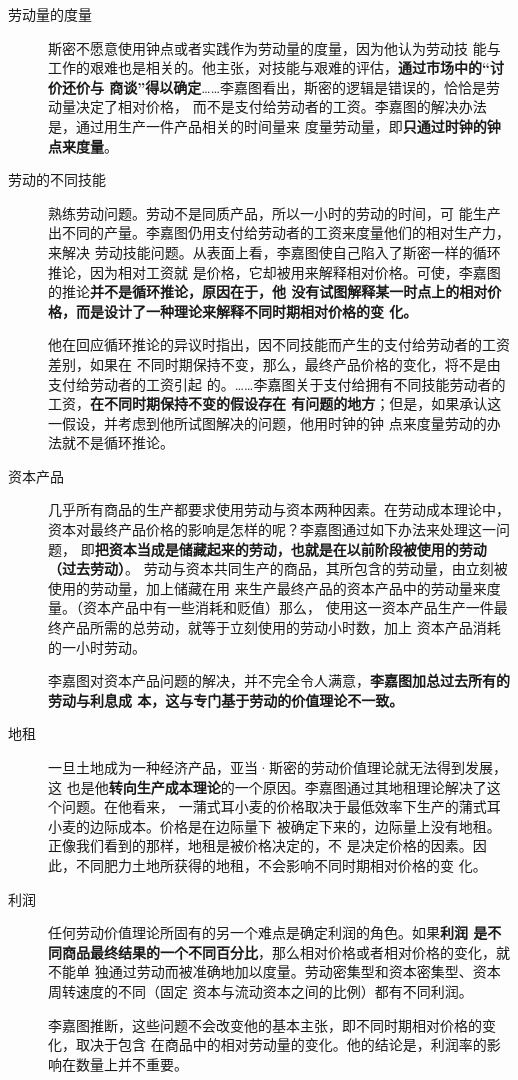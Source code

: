 \begin{description}
\item[劳动量的度量] 斯密不愿意使用钟点或者实践作为劳动量的度量，因为他认为劳动技
  能与工作的艰难也是相关的。他主张，对技能与艰难的评估，\textbf{通过市场中的“讨价还价与
  商谈”得以确定}……李嘉图看出，斯密的逻辑是错误的，恰恰是劳动量决定了相对价格，
  而不是支付给劳动者的工资。李嘉图的解决办法是，通过用生产一件产品相关的时间量来
  度量劳动量，即\textbf{只通过时钟的钟点来度量}。

\item[劳动的不同技能] 熟练劳动问题。劳动不是同质产品，所以一小时的劳动的时间，可
  能生产出不同的产量。李嘉图仍用支付给劳动者的工资来度量他们的相对生产力，来解决
  劳动技能问题。从表面上看，李嘉图使自己陷入了斯密一样的循环推论，因为相对工资就
  是价格，它却被用来解释相对价格。可使，李嘉图的推论\textbf{并不是循环推论，原因在于，他
  没有试图解释某一时点上的相对价格，而是设计了一种理论来解释不同时期相对价格的变
  化。}

  他在回应循环推论的异议时指出，因不同技能而产生的支付给劳动者的工资差别，如果在
  不同时期保持不变，那么，最终产品价格的变化，将不是由支付给劳动者的工资引起
  的。……李嘉图关于支付给拥有不同技能劳动者的工资，\textbf{在不同时期保持不变的假设存在
  有问题的地方}；但是，如果承认这一假设，并考虑到他所试图解决的问题，他用时钟的钟
  点来度量劳动的办法就不是循环推论。

\item[资本产品] 几乎所有商品的生产都要求使用劳动与资本两种因素。在劳动成本理论中，
  资本对最终产品价格的影响是怎样的呢？李嘉图通过如下办法来处理这一问题，
  即\textbf{把资本当成是储藏起来的劳动，也就是在以前阶段被使用的劳动（过去劳动）}。
  劳动与资本共同生产的商品，其所包含的劳动量，由立刻被使用的劳动量，加上储藏在用
  来生产最终产品的资本产品中的劳动量来度量。（资本产品中有一些消耗和贬值）那么，
  使用这一资本产品生产一件最终产品所需的总劳动，就等于立刻使用的劳动小时数，加上
  资本产品消耗的一小时劳动。

  李嘉图对资本产品问题的解决，并不完全令人满意，\textbf{李嘉图加总过去所有的劳动与利息成
  本，这与专门基于劳动的价值理论不一致。}

\item[地租] 一旦土地成为一种经济产品，亚当·斯密的劳动价值理论就无法得到发展，这
  也是他\textbf{转向生产成本理论}的一个原因。李嘉图通过其地租理论解决了这个问题。在他看来，
  一蒲式耳小麦的价格取决于最低效率下生产的蒲式耳小麦的边际成本。价格是在边际量下
  被确定下来的，边际量上没有地租。正像我们看到的那样，地租是被价格决定的，不
  是决定价格的因素。因此，不同肥力土地所获得的地租，不会影响不同时期相对价格的变
  化。

\item[利润] 任何劳动价值理论所固有的另一个难点是确定利润的角色。如果\textbf{利润
    是不同商品最终结果的一个不同百分比}，那么相对价格或者相对价格的变化，就不能单
  独通过劳动而被准确地加以度量。劳动密集型和资本密集型、资本周转速度的不同（固定
  资本与流动资本之间的比例）都有不同利润。

  李嘉图推断，这些问题不会改变他的基本主张，即不同时期相对价格的变化，取决于包含
  在商品中的相对劳动量的变化。他的结论是，利润率的影响在数量上并不重要。
\end{description}

